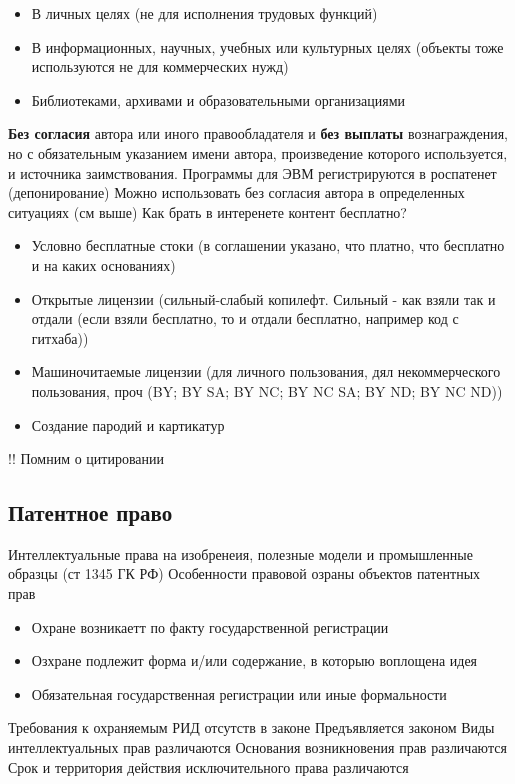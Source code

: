 \documentclass[12pt]{article}
\begin{document}
\begin{itemize}
\item
  В личных целях (не для исполнения трудовых функций)
\item
  В информационных, научных, учебных или культурных целях (объекты тоже
  используются не для коммерческих нужд)
\item
  Библиотеками, архивами и образовательными организациями
\end{itemize}

\textbf{Без согласия} автора или иного правообладателя и \textbf{без
выплаты} вознаграждения, но с обязательным указанием имени автора,
произведение которого используется, и источника заимствования. Программы
для ЭВМ регистрируются в роспатенет (депонирование) Можно использовать
без согласия автора в определенных ситуациях (см выше) Как брать в
интеренете контент бесплатно?

\begin{itemize}
\item
  Условно бесплатные стоки (в соглашении указано, что платно, что
  бесплатно и на каких основаниях)
\item
  Открытые лицензии (сильный-слабый копилефт. Сильный - как взяли так и
  отдали (если взяли бесплатно, то и отдали бесплатно, например код с
  гитхаба))
\item
  Машиночитаемые лицензии (для личного пользования, дял некоммерческого
  пользования, проч (BY; BY SA; BY NC; BY NC SA; BY ND; BY NC ND))
\item
  Создание пародий и картикатур
\end{itemize}

!! Помним о цитировании 
\subsection{Патентное право}
Интеллектуальные права на
изобренеия, полезные модели и промышленные образцы (ст 1345 ГК РФ)
Особенности правовой озраны объектов патентных прав 
\begin{itemize}
\item Охране возникаетт
по факту государственной регистрации 
\item Озхране подлежит форма и/или
содержание, в которыю воплощена идея 
\item Обязательная государственная
регистрации или иные формальности
\end{itemize}

Требования к охраняемым РИД отсутств в законе
Предъявляется законом
Виды интеллектуальных прав различаются
Основания возникновения прав различаются
Срок и территория действия исключительного права различаются
\end{document}
